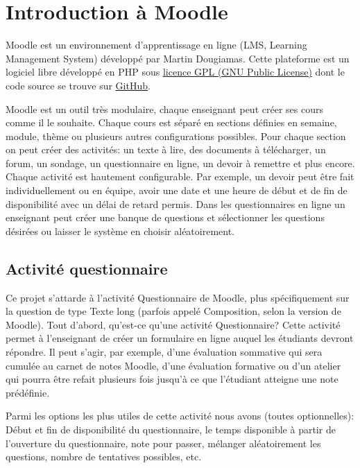\chapter{Introduction à Moodle}

Moodle est un environnement d'apprentissage en ligne (LMS, Learning Management System) développé par Martin Dougiamas.
Cette plateforme est un logiciel libre développé en PHP sous \href{http://docs.moodle.org/dev/License}{licence GPL (GNU Public License)} dont le code source se trouve sur \href{https://github.com/moodle/moodle}{GitHub}.

Moodle est un outil très modulaire, chaque enseignant peut créer ses cours comme il le souhaite.
Chaque cours est séparé en sections définies en semaine, module, thème ou plusieurs autres configurations possibles.
Pour chaque section on peut créer des activités: un texte à lire, des documents à télécharger, un forum, un sondage, un questionnaire en ligne, un devoir à remettre et plus encore.
Chaque activité est hautement configurable.
Par exemple, un devoir peut être fait individuellement ou en équipe, avoir une date et une heure de début et de fin de disponibilité avec un délai de retard permis.
Dans les questionnaires en ligne un enseignant peut créer une banque de questions et sélectionner les questions désirées ou laisser le système en choisir aléatoirement.

\section{Activité questionnaire}

Ce projet s'attarde à l'activité Questionnaire de Moodle, plus spécifiquement sur la question de type Texte long (parfois appelé Composition, selon la version de Moodle).
Tout d'abord, qu'est-ce qu'une activité Questionnaire?
Cette activité permet à l'enseignant de créer un formulaire en ligne auquel les étudiants devront répondre.
Il peut s'agir, par exemple, d'une évaluation sommative qui sera cumulée au carnet de notes Moodle, d'une évaluation formative ou d'un atelier qui pourra être refait plusieurs fois jusqu'à ce que l'étudiant atteigne une note prédéfinie.

Parmi les options les plus utiles de cette activité nous avons (toutes optionnelles): Début et fin de disponibilité du questionnaire, le temps disponible à partir de l'ouverture du questionnaire, note pour passer, mélanger aléatoirement les questions, nombre de tentatives possibles, etc.

